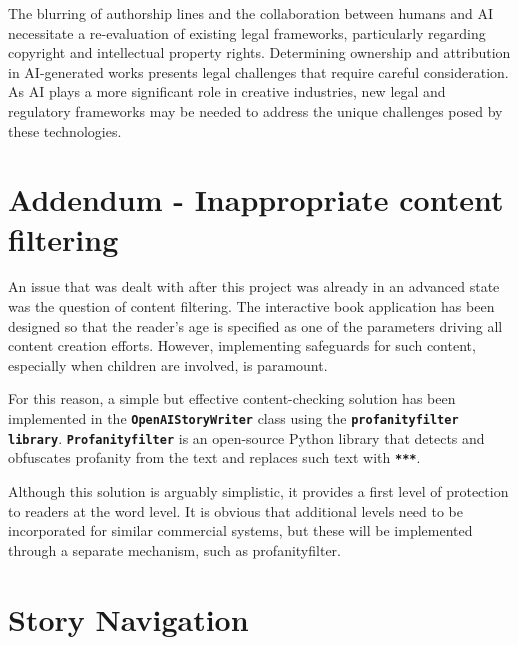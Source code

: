 \documentclass[conference]{IEEEtran}
\begin{document}
	
	The blurring of authorship lines and the collaboration between humans and AI necessitate a re-evaluation of existing legal frameworks, particularly regarding copyright and intellectual property rights\cite{kur2019european}. Determining ownership and attribution in AI-generated works presents legal challenges that require careful consideration. As AI plays a more significant role in creative industries, new legal and regulatory frameworks may be needed to address the unique challenges posed by these technologies.
	
	\section{Addendum - Inappropriate content filtering}
	
	An issue that was dealt with after this project was already in an advanced state was the question of content filtering. The interactive book application has been designed so that the reader's age is specified as one of the parameters driving all content creation efforts. However, implementing safeguards for such content, especially when children are involved, is paramount.
	
	For this reason, a simple but effective content-checking solution has been implemented in the \textbf{\texttt{OpenAIStoryWriter}} class using the \textbf{\texttt{profanityfilter library}}. \textbf{\texttt{Profanityfilter}} is an open-source Python library that detects and obfuscates profanity from the text and replaces such text with \textbf{\texttt{***}}.
	
	Although this solution is arguably simplistic, it provides a first level of protection to readers at the word level. It is obvious that additional levels need to be incorporated for similar commercial systems, but these will be implemented through a separate mechanism, such as profanityfilter.
	
	
	
	
\printbibliography
\onecolumn
\pagebreak

\appendices

\section{Story Navigation}
\label{appendix:navigation}
	
\end{document}
